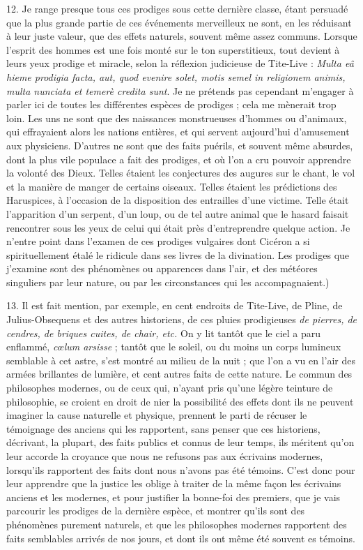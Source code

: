 \documentclass[a4paper, 11pt, oneside, polutonikogreek, french]{article}
\begin{document}
12. Je range presque tous ces prodiges sous cette dernière classe, étant persuadé que la plus grande partie de ces événements merveilleux ne sont, en les réduisant à leur juste valeur, que des effets naturels, souvent même assez communs. Lorsque l'esprit des hommes est une fois monté sur le ton superstitieux, tout devient à leurs yeux prodige et miracle, selon la réflexion judicieuse de Tite-Live : \emph{Multa eâ hieme prodigia facta, aut, quod evenire solet, motis semel in religionem animis, multa nunciata et temerè credita sunt}. Je ne prétends pas cependant m'engager à parler ici de toutes les différentes espèces de prodiges ; cela me mènerait trop loin. Les uns ne sont que des naissances monstrueuses d'hommes ou d'animaux, qui effrayaient alors les nations entières, et qui servent aujourd'hui d'amusement aux physiciens. D'autres ne sont que des faits puérils, et souvent même absurdes, dont la plus vile populace a fait des prodiges, et où l'on a cru pouvoir apprendre la volonté des Dieux. Telles étaient les conjectures des augures sur le chant, le vol et la manière de manger de certains oiseaux. Telles étaient les prédictions des Haruspices, à l'occasion de la disposition des entrailles d'une victime. Telle était l'apparition d'un serpent, d'un loup, ou de tel autre animal que le hasard faisait rencontrer sous les yeux de celui qui était près d'entreprendre quelque action. Je n'entre point dans l'examen de ces prodiges vulgaires dont Cicéron a si spirituellement étalé le ridicule dans ses livres de la divination. Les prodiges que j'examine sont des phénomènes ou apparences dans l'air, et des météores singuliers par leur nature, ou par les circonstances qui les accompagnaient.)

13. Il est fait mention, par exemple, en cent endroits de Tite-Live, de Pline, de Julius-Obsequens et des autres historiens, de ces pluies prodigieuses \emph{de pierres, de cendres, de briques cuites, de chair, etc.} On y lit tantôt que le ciel a paru enflammé, \emph{cœlum arsisse} ; tantôt que le soleil, ou du moins un corps lumineux semblable à cet astre, s'est montré au milieu de la nuit ; que l'on a vu en l'air des armées brillantes de lumière, et cent autres faits de cette nature. Le commun des philosophes modernes, ou de ceux qui, n'ayant pris qu'une légère teinture de philosophie, se croient en droit de nier la possibilité des effets dont ils ne peuvent imaginer la cause naturelle et physique, prennent le parti de récuser le témoignage des anciens qui les rapportent, sans penser que ces historiens, décrivant, la plupart, des faits publics et connus de leur temps, ils méritent qu'on leur accorde la croyance que nous ne refusons pas aux écrivains modernes, lorsqu'ils rapportent des faits dont nous n'avons pas été témoins. C'est donc pour leur apprendre que la justice les oblige à traiter de la même façon les écrivains anciens et les modernes, et pour justifier la bonne-foi des premiers, que je vais parcourir les prodiges de la dernière espèce, et montrer qu'ils sont des phénomènes purement naturels, et que les philosophes modernes rapportent des faits semblables arrivés de nos jours, et dont ils ont même été souvent es témoins.
\end{document}
